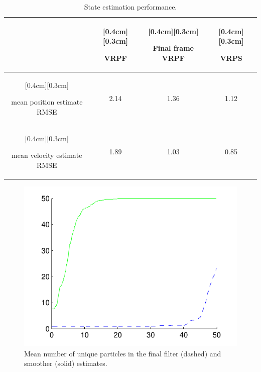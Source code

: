 \documentclass[journal]{IEEEtran}
\begin{document}
\begin{table}%
\caption{State estimation performance.}
\label{tab:tracking_state_performance}
\centering
\renewcommand{\arraystretch}{1.5}
\begin{tabular}{|c|c|c|c|}
\hline
 &\raisebox{0cm}[0.4cm][0.3cm]{\parbox[c]{1.5cm}{\centering VRPF}} & \raisebox{0cm}[0.4cm][0.3cm]{\parbox[c]{1.5cm}{\centering Final frame VRPF}} & \raisebox{0cm}[0.4cm][0.3cm]{\parbox[c]{1.5cm}{\centering VRPS}} \\
\hline \hline
\raisebox{0cm}[0.4cm][0.3cm]{\parbox[c]{2cm}{\centering mean position estimate RMSE}} & 2.14 & 1.36 & 1.12 \\
\hline
\raisebox{0cm}[0.4cm][0.3cm]{\parbox[c]{2cm}{\centering mean velocity estimate RMSE}} & 1.89 & 1.03 & 0.85 \\
\hline
\end{tabular}
\end{table}

\begin{figure}[!t]
\centering
\includegraphics[width=0.9\columnwidth]{unique_particles.pdf}
\caption{Mean number of unique particles in the final filter (dashed) and smoother (solid) estimates.}
\label{fig:unique_particles}
\end{figure}
\end{document}
